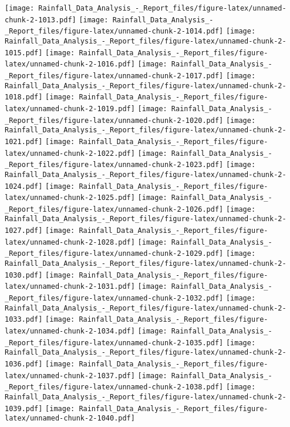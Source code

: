 \documentclass[
]{article}
\begin{document}
\texttt{[image: Rainfall\_Data\_Analysis\_-\_Report\_files/figure-latex/unnamed-chunk-2-1013.pdf]}
\texttt{[image: Rainfall\_Data\_Analysis\_-\_Report\_files/figure-latex/unnamed-chunk-2-1014.pdf]}
\texttt{[image: Rainfall\_Data\_Analysis\_-\_Report\_files/figure-latex/unnamed-chunk-2-1015.pdf]}
\texttt{[image: Rainfall\_Data\_Analysis\_-\_Report\_files/figure-latex/unnamed-chunk-2-1016.pdf]}
\texttt{[image: Rainfall\_Data\_Analysis\_-\_Report\_files/figure-latex/unnamed-chunk-2-1017.pdf]}
\texttt{[image: Rainfall\_Data\_Analysis\_-\_Report\_files/figure-latex/unnamed-chunk-2-1018.pdf]}
\texttt{[image: Rainfall\_Data\_Analysis\_-\_Report\_files/figure-latex/unnamed-chunk-2-1019.pdf]}
\texttt{[image: Rainfall\_Data\_Analysis\_-\_Report\_files/figure-latex/unnamed-chunk-2-1020.pdf]}
\texttt{[image: Rainfall\_Data\_Analysis\_-\_Report\_files/figure-latex/unnamed-chunk-2-1021.pdf]}
\texttt{[image: Rainfall\_Data\_Analysis\_-\_Report\_files/figure-latex/unnamed-chunk-2-1022.pdf]}
\texttt{[image: Rainfall\_Data\_Analysis\_-\_Report\_files/figure-latex/unnamed-chunk-2-1023.pdf]}
\texttt{[image: Rainfall\_Data\_Analysis\_-\_Report\_files/figure-latex/unnamed-chunk-2-1024.pdf]}
\texttt{[image: Rainfall\_Data\_Analysis\_-\_Report\_files/figure-latex/unnamed-chunk-2-1025.pdf]}
\texttt{[image: Rainfall\_Data\_Analysis\_-\_Report\_files/figure-latex/unnamed-chunk-2-1026.pdf]}
\texttt{[image: Rainfall\_Data\_Analysis\_-\_Report\_files/figure-latex/unnamed-chunk-2-1027.pdf]}
\texttt{[image: Rainfall\_Data\_Analysis\_-\_Report\_files/figure-latex/unnamed-chunk-2-1028.pdf]}
\texttt{[image: Rainfall\_Data\_Analysis\_-\_Report\_files/figure-latex/unnamed-chunk-2-1029.pdf]}
\texttt{[image: Rainfall\_Data\_Analysis\_-\_Report\_files/figure-latex/unnamed-chunk-2-1030.pdf]}
\texttt{[image: Rainfall\_Data\_Analysis\_-\_Report\_files/figure-latex/unnamed-chunk-2-1031.pdf]}
\texttt{[image: Rainfall\_Data\_Analysis\_-\_Report\_files/figure-latex/unnamed-chunk-2-1032.pdf]}
\texttt{[image: Rainfall\_Data\_Analysis\_-\_Report\_files/figure-latex/unnamed-chunk-2-1033.pdf]}
\texttt{[image: Rainfall\_Data\_Analysis\_-\_Report\_files/figure-latex/unnamed-chunk-2-1034.pdf]}
\texttt{[image: Rainfall\_Data\_Analysis\_-\_Report\_files/figure-latex/unnamed-chunk-2-1035.pdf]}
\texttt{[image: Rainfall\_Data\_Analysis\_-\_Report\_files/figure-latex/unnamed-chunk-2-1036.pdf]}
\texttt{[image: Rainfall\_Data\_Analysis\_-\_Report\_files/figure-latex/unnamed-chunk-2-1037.pdf]}
\texttt{[image: Rainfall\_Data\_Analysis\_-\_Report\_files/figure-latex/unnamed-chunk-2-1038.pdf]}
\texttt{[image: Rainfall\_Data\_Analysis\_-\_Report\_files/figure-latex/unnamed-chunk-2-1039.pdf]}
\texttt{[image: Rainfall\_Data\_Analysis\_-\_Report\_files/figure-latex/unnamed-chunk-2-1040.pdf]}
\end{document}
